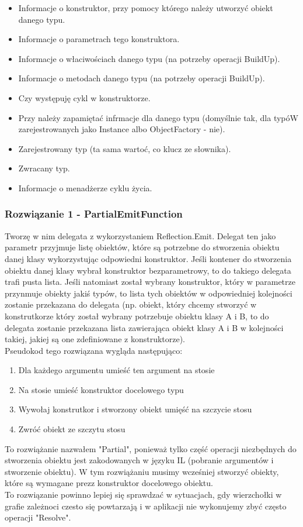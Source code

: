 \documentclass[12pt]{article}
\begin{document}
\begin{itemize}
	\item Informacje o konstruktor, przy pomocy którego należy utworzyć obiekt danego typu.
	\item Informacje o parametrach tego konstruktora.
	\item Informacje o właciwościach danego typu (na potrzeby operacji BuildUp).
	\item Informacje o metodach danego typu (na potrzeby operacji BuildUp).
	\item Czy występuję cykl w konstruktorze.
	\item Przy należy zapamiętać infrmacje dla danego typu (domyślnie tak, dla typóW zarejestrowanych jako Instance albo ObjectFactory - nie).
	\item Zarejestrowany typ (ta sama wartoć, co klucz ze słownika).
	\item Zwracany typ.
	\item Informacje o menadżerze cyklu życia.
\end{itemize}

\subsubsection{Rozwiązanie 1 - PartialEmitFunction}
Tworzę w nim delegata z wykorzystaniem Reflection.Emit. Delegat ten jako parametr przyjmuje listę obiektów, które są potrzebne do stworzenia obiektu danej klasy wykorzystując odpowiedni konstruktor. Jeśli kontener do stworzenia obiektu danej klasy wybrał konstruktor bezparametrowy, to do takiego delegata trafi pusta lista. Jeśli natomiast został wybrany konstruktor, który w parametrze przynmuje obiekty jakiś typów, to lista tych obiektów w odpowiedniej kolejności zostanie przekazana do delegata (np. obiekt, który chcemy stworzyć w konstrutkorze który został wybrany potrzebuje obiektu klasy A i B, to do delegata zostanie przekazana lista zawierająca obiekt klasy A i B w kolejności takiej, jakiej są one zdefiniowane z konstruktorze).\\
Pseudokod tego rozwiązana wygląda następująco:
\begin{enumerate}
	\item Dla każdego argumentu umieść ten argument na stosie
	\item Na stosie umieść konstruktor docelowego typu
	\item Wywołaj konstrutkor i stworzony obiekt umięść na szczycie stosu
	\item Zwróć obiekt ze szczytu stosu
\end{enumerate}
To rozwiążanie nazwałem "Partial", ponieważ tylko część operacji niezbędnych do stworzenia obiektu jest zakodowanych w języku IL (pobranie argumentów i stworzenie obiektu). W tym rozwiążaniu musimy wcześniej stworzyć obiekty, które są wymagane prezz konstruktor docelowego obiektu.\\
To rozwiązanie powinno lepiej się sprawdzać w sytuacjach, gdy wierzchołki w grafie zależnoci czesto się powtarzają i w aplikacji nie wykonujemy zbyć często operacji "Resolve".
\end{document}

